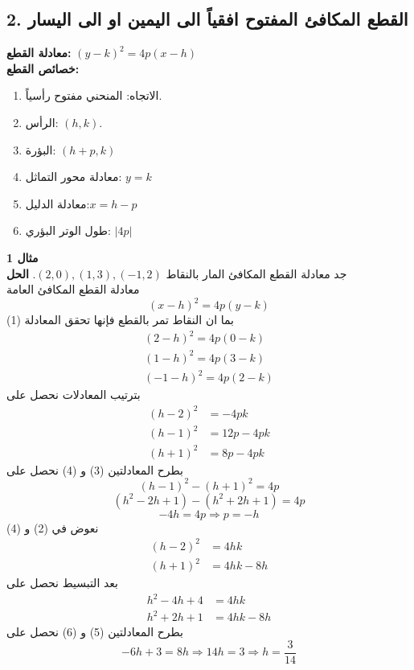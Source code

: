 \subsection*{2. القطع المكافئ المفتوح افقياً الى اليمين او الى اليسار}
\textbf{معادلة القطع:} \quad $(y-k)^2 = 4p(x-h)$\\[10pt]
\textbf{خصائص القطع:} 
\begin{enumerate}
	\item الاتجاه: \quad المنحني مفتوح رأسياً.
	\item الرأس: \quad $(h, k)$.
	\item البؤرة: \quad $(h+p, k)$
	\item معادلة محور التماثل:  \quad $y=k$
	\item معادلة الدليل:\quad $x=h-p$
	\item طول الوتر البؤري: \quad $|4p|$
\end{enumerate}
\vspace{10pt}
\noindent
\textbf{مثال 1}\\
\noindent
جد معادلة القطع المكافئ المار بالنقاط 
$(2, 0), (1, 3), (-1,2)$.
\noindent
\textbf{الحل}\\
\noindent
معادلة القطع المكافئ العامة 
\begin{equation}
(x-h)^2 = 4p(y-k)
\end{equation}
بما ان النقاط تمر بالقطع فإنها تحقق المعادلة (1)
\begin{align*}
	(2-h)^2 = 4p(0-k)\\
	(1-h)^2 = 4p(3-k)\\
	(-1-h)^2 = 4p(2-k)
\end{align*}
بترتيب المعادلات نحصل على 
\begin{align}
	(h-2)^2 &= -4pk\\
	(h-1)^2 &= 12p - 4pk\\
	(h+1)^2 &= 8p - 4pk
\end{align}
بطرح المعادلتين (3) و (4) نحصل على
\[
(h-1)^2 - (h+1)^2 = 4p
\]
\[
(h^2 -2h+1)-(h^2+2h+1) = 4p
\]
\[
-4h = 4p \Rightarrow \boxed{p = - h}
\]
نعوض في (2) و (4)
\begin{align*}
	(h-2)^2 &= 4hk\\
	(h+1)^2 &= 4hk - 8h 
\end{align*}
بعد التبسيط نحصل على 
\begin{align}
	h^2 -4h + 4 &= 4hk\\
	h^2+2h+1 &= 4hk - 8h  
\end{align}
بطرح المعادلتين (5) و (6) نحصل على
\[
-6h + 3 = 8h \Rightarrow 14h = 3 \Rightarrow \boxed{h = \frac{3}{14}}
\]
